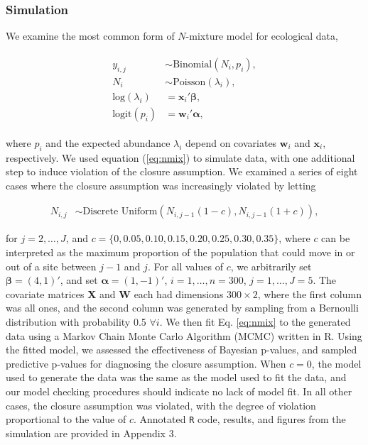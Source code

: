 \documentclass[12pt,english]{article}
\begin{document}
\begin{spacing}{1.9}
\subsubsection*{Simulation}

We examine the most common form of $N$-mixture model for ecological
data,
\begin{linenomath}
  \begin{align}
    \begin{split}
      y_{i,j} & \sim \text{Binomial}(N_{i},p_i),\\
      N_{i} & \sim \text{Poisson}(\lambda_{i}), \\
      \text{log}(\lambda_i) & = \textbf{x}_i'\boldsymbol{\beta},
      \\
      \text{logit}(p_i) & = \textbf{w}_i'\boldsymbol{\alpha},
    \end{split}
                          \label{eq:nmix}
  \end{align}
\end{linenomath}
where $p_i$ and the expected abundance $\lambda_i$ depend on
covariates $\textbf{w}_i$ and $\textbf{x}_i$, respectively. We used
equation (\ref{eq:nmix}) to simulate data, with one additional step to
induce violation of the closure assumption. We examined a series of
eight cases where the closure assumption was increasingly violated by
letting
\begin{linenomath}
  \begin{align}
    N_{i,j} & \sim \text{Discrete Uniform}(N_{i,j-1}(1-c), N_{i,j-1}(1+c)),
  \end{align}
\end{linenomath}
for $j=2,\ldots,J$, and
$c = \{0, 0.05, 0.10, 0.15, 0.20, 0.25, 0.30, 0.35 \}$, where $c$ can
be interpreted as the maximum proportion of the population that could
move in or out of a site between $j-1$ and $j$. For all values of $c$,
we arbitrarily set $\boldsymbol{\beta}=(4,1)'$, and set
$\boldsymbol{\alpha}=(1,-1)'$, $i=1,\ldots,n=300$,
$j=1,\ldots,J=5$. The covariate matrices \textbf{X} and \textbf{W}
each had dimensions $300\times 2$, where the first column was all
ones, and the second column was generated by sampling from a Bernoulli
distribution with probability 0.5 $\forall i$. We then fit
Eq. \ref{eq:nmix} to the generated data using a Markov Chain Monte
Carlo Algorithm (MCMC) written in R. Using the fitted model, we
assessed the effectiveness of Bayesian p-values, and sampled
predictive p-values for diagnosing the closure assumption. When $c=0$,
the model used to generate the data was the same as the model used to
fit the data, and our model checking procedures should indicate no
lack of model fit. In all other cases, the closure assumption was
violated, with the degree of violation proportional to the value of
$c$. Annotated \texttt{R} code, results, and figures from the
simulation are provided in Appendix 3.


\end{spacing}
\end{document}
